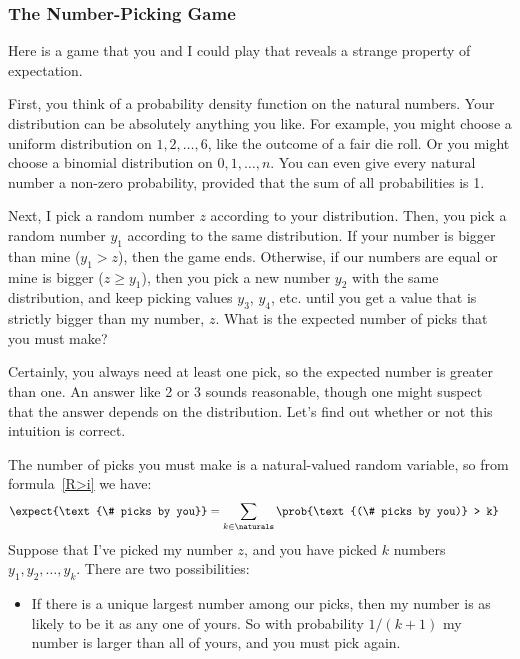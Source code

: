 \begin{editingnotes}
\iffalse
\textbf{Question:} What can we say about the product of expectations?
For example, can we say $\expect{R_1 R_2} = \expect{R_1}
\expect{R_2}$?  Not in general.  We will see more of this in just a
little bit.
\fi

\subsubsection{The Number-Picking Game}

Here is a game that you and I could play that reveals a strange
property of expectation.

First, you think of a probability density function on the natural
numbers.  Your distribution can be absolutely anything you like.  For
example, you might choose a uniform distribution on $1, 2, \dots, 6$,
like the outcome of a fair die roll.  Or you might choose a binomial
distribution on $0, 1, \dots, n$.  You can even give every natural
number a non-zero probability, provided that the sum of all
probabilities is 1.

Next, I pick a random number $z$ according to your distribution.
Then, you pick a random number $y_1$ according to the same
distribution.  If your number is bigger than mine ($y_1 > z$), then
the game ends.  Otherwise, if our numbers are equal or mine is bigger
($z \geq y_1$), then you pick a new number $y_2$ with the same
distribution, and keep picking values $y_3$, $y_4$, etc. until you get
a value that is strictly bigger than my number, $z$.  What is the
expected number of picks that you must make?

Certainly, you always need at least one pick, so the expected number
is greater than one.  An answer like 2 or 3 sounds reasonable, though
one might suspect that the answer depends on the distribution.  Let's
find out whether or not this intuition is correct.

The number of picks you must make is a natural-valued random variable, so
from formula~\eqref{R>i} we have:
\begin{align}
\expect{\text{\# picks by you}}
    & = \sum_{k \in \naturals} \prob{\text{(\# picks by you)} > k} \label{eqn:1}
\end{align}
Suppose that I've picked my number $z$, and you have picked $k$
numbers $y_1, y_2, \dots, y_k$.  There are two possibilities:
%
\begin{itemize}

\item If there is a unique largest number among our picks, then my
number is as likely to be it as any one of yours.  So with probability
$1/(k+1)$ my number is larger than all of yours, and you must pick
again.


\end{itemize}
\end{editingnotes}
